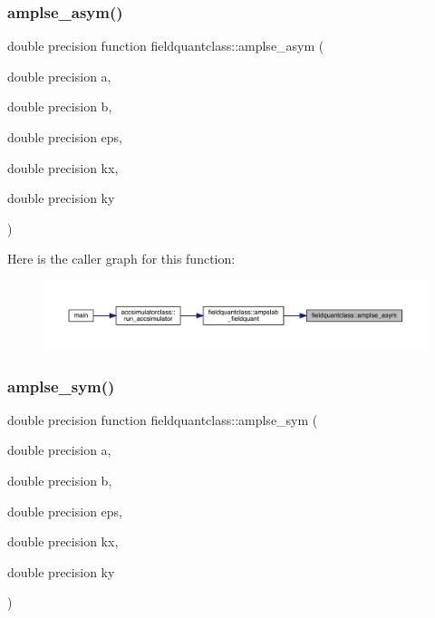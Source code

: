 \subsubsection{\texorpdfstring{amplse\_asym()}{amplse\_asym()}}
{\footnotesize\ttfamily double precision function fieldquantclass\+::amplse\+\_\+asym (\begin{DoxyParamCaption}\item[{double precision}]{a,  }\item[{double precision}]{b,  }\item[{double precision}]{eps,  }\item[{double precision}]{kx,  }\item[{double precision}]{ky }\end{DoxyParamCaption})}

Here is the caller graph for this function\+:\nopagebreak
\begin{figure}[H]
\begin{center}
\leavevmode
\includegraphics[width=350pt]{namespacefieldquantclass_a735a6d51aabd219f525edeb04b034150_icgraph}
\end{center}
\end{figure}
\mbox{\label{namespacefieldquantclass_a8eb7b870ec7c240279076fbb6269ff07}} 
\subsubsection{\texorpdfstring{amplse\_sym()}{amplse\_sym()}}
{\footnotesize\ttfamily double precision function fieldquantclass\+::amplse\+\_\+sym (\begin{DoxyParamCaption}\item[{double precision}]{a,  }\item[{double precision}]{b,  }\item[{double precision}]{eps,  }\item[{double precision}]{kx,  }\item[{double precision}]{ky }\end{DoxyParamCaption})}

